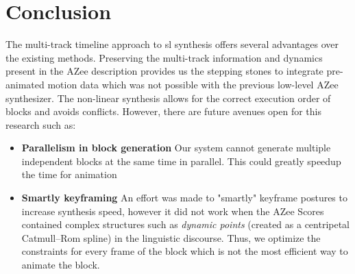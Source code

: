 \documentclass[../../main.tex]{subfiles}
\begin{document}
\section{Conclusion}
\label{ch:multi_track:conclusion}

The multi-track timeline approach to \gls{sl} synthesis offers several advantages over the existing methods. Preserving the multi-track information and dynamics present in the AZee description provides us the stepping stones to integrate pre-animated motion data which was not possible with the previous low-level AZee synthesizer. The non-linear synthesis allows for the correct execution order of blocks and avoids conflicts. However, there are future avenues open for this research such as:

\begin{itemize}
    \item \textbf{Parallelism in block generation} Our system cannot generate multiple independent blocks at the same time in parallel. This could greatly speedup the time for animation
    \item \textbf{Smartly keyframing} An effort was made to "smartly" keyframe postures to increase synthesis speed, however it did not work when the AZee Scores contained complex structures such as \emph{dynamic points} (created as a centripetal Catmull–Rom spline) in the linguistic discourse. Thus, we optimize the constraints for every frame of the block which is not the most efficient way to animate the block.
\end{itemize}
\end{document}
